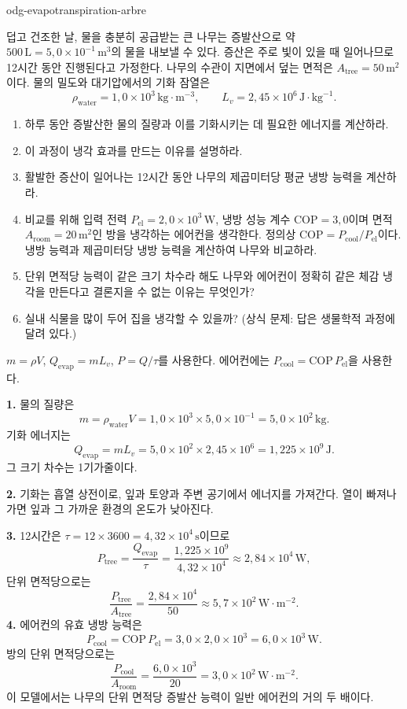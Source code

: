 \begin{exo}{odg-evapotranspiration-arbre}

덥고 건조한 날, 물을 충분히 공급받는 큰 나무는 증발산으로 약 $500\,\text{L}=5{,}0\times10^{-1}\,\text{m}^3$의 물을 내보낼 수 있다. 증산은 주로 빛이 있을 때 일어나므로 12시간 동안 진행된다고 가정한다. 나무의 수관이 지면에서 덮는 면적은 $A_{\text{tree}}=50\,\text{m}^2$이다. 물의 밀도와 대기압에서의 기화 잠열은
\[
\rho_{\text{water}}=1{,}0\times10^3\,\text{kg}\!\cdot\!\text{m}^{-3},
\qquad L_v=2{,}45\times10^6\,\text{J}\!\cdot\!\text{kg}^{-1}.
\]
\begin{enumerate}
  \item 하루 동안 증발산한 물의 질량과 이를 기화시키는 데 필요한 에너지를 계산하라.
  \item 이 과정이 냉각 효과를 만드는 이유를 설명하라.
  \item 활발한 증산이 일어나는 12시간 동안 나무의 제곱미터당 평균 냉방 능력을 계산하라.
  \item 비교를 위해 입력 전력 $P_{\mathrm{el}}=2{,}0\times10^3\,\text{W}$, 냉방 성능 계수 $\mathrm{COP}=3{,}0$이며 면적 $A_{\text{room}}=20\,\text{m}^2$인 방을 냉각하는 에어컨을 생각한다. 정의상 $\mathrm{COP}=P_{\text{cool}}/P_{\mathrm{el}}$이다. 냉방 능력과 제곱미터당 냉방 능력을 계산하여 나무와 비교하라.
  \item 단위 면적당 능력이 같은 크기 차수라 해도 나무와 에어컨이 정확히 같은 체감 냉각을 만든다고 결론지을 수 없는 이유는 무엇인가?
  \item 실내 식물을 많이 두어 집을 냉각할 수 있을까? (상식 문제: 답은 생물학적 과정에 달려 있다.)
\end{enumerate}
\begin{indication}
$m=\rho V$, $Q_{\mathrm{evap}}=mL_v$, $P=Q/\tau$를 사용한다. 에어컨에는 $P_{\text{cool}}=\mathrm{COP}\,P_{\mathrm{el}}$을 사용한다.
\end{indication}
\begin{solution}
\textbf{1.} 물의 질량은
\[
m=\rho_{\text{water}}V=1{,}0\times10^3\times5{,}0\times10^{-1}
=5{,}0\times10^2\,\text{kg}.
\]
기화 에너지는
\[
Q_{\mathrm{evap}}=mL_v=5{,}0\times10^2\times2{,}45\times10^6
=1{,}225\times10^9\,\text{J}.
\]
그 크기 차수는 1기가줄이다.

\textbf{2.} 기화는 흡열 상전이로, 잎과 토양과 주변 공기에서 에너지를 가져간다. 열이 빠져나가면 잎과 그 가까운 환경의 온도가 낮아진다.

\textbf{3.} 12시간은 $\tau=12\times3600=4{,}32\times10^4\,\text{s}$이므로
\[
P_{\text{tree}}=\frac{Q_{\mathrm{evap}}}{\tau}
=\frac{1{,}225\times10^9}{4{,}32\times10^4}\approx2{,}84\times10^4\,\text{W},
\]
단위 면적당으로는
\[
\frac{P_{\text{tree}}}{A_{\text{tree}}}
=\frac{2{,}84\times10^4}{50}\approx5{,}7\times10^2\,\text{W}\!\cdot\!\text{m}^{-2}.
\]
\textbf{4.} 에어컨의 유효 냉방 능력은
\[
P_{\text{cool}}=\mathrm{COP}\,P_{\mathrm{el}}
=3{,}0\times2{,}0\times10^3=6{,}0\times10^3\,\text{W}.
\]
방의 단위 면적당으로는
\[
\frac{P_{\text{cool}}}{A_{\text{room}}}
=\frac{6{,}0\times10^3}{20}=3{,}0\times10^2\,\text{W}\!\cdot\!\text{m}^{-2}.
\]
이 모델에서는 나무의 단위 면적당 증발산 능력이 일반 에어컨의 거의 두 배이다.


\end{solution}
\end{exo}
